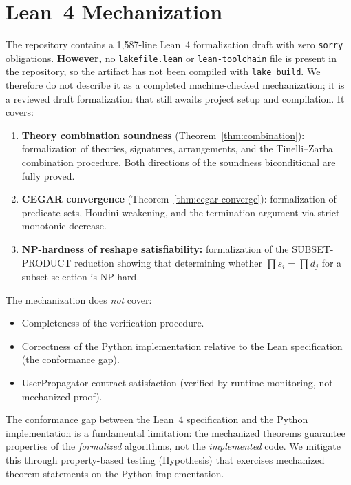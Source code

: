 \documentclass[11pt]{article}
\begin{document}
\section{Lean~4 Mechanization}\label{sec:lean}

The repository contains a 1,587-line Lean~4 formalization draft with zero
\texttt{sorry} obligations. \textbf{However,} no \texttt{lakefile.lean}
or \texttt{lean-toolchain} file is present in the repository, so the
artifact has not been compiled with \texttt{lake build}. We therefore do
not describe it as a completed machine-checked mechanization; it is a
reviewed draft formalization that still awaits project setup and
compilation.
It covers:

\begin{enumerate}[leftmargin=2em]
  \item \textbf{Theory combination soundness} (Theorem~\ref{thm:combination}):
    formalization of theories, signatures, arrangements, and the
    Tinelli--Zarba combination procedure.  Both directions of the
    soundness biconditional are fully proved.
  \item \textbf{CEGAR convergence} (Theorem~\ref{thm:cegar-converge}):
    formalization of predicate sets, Houdini weakening, and the
    termination argument via strict monotonic decrease.
  \item \textbf{NP-hardness of reshape satisfiability:}
    formalization of the SUBSET-PRODUCT reduction showing that
    determining whether $\prod s_i = \prod d_j$ for a
    subset selection is NP-hard.
\end{enumerate}

The mechanization does \emph{not} cover:
\begin{itemize}[leftmargin=2em]
  \item Completeness of the verification procedure.
  \item Correctness of the Python implementation relative
    to the Lean specification (the conformance gap).
  \item UserPropagator contract satisfaction (verified by
    runtime monitoring, not mechanized proof).
\end{itemize}

The conformance gap between the Lean~4 specification and the
Python implementation is a fundamental limitation: the
mechanized theorems guarantee properties of the \emph{formalized}
algorithms, not the \emph{implemented} code.  We mitigate this
through property-based testing (Hypothesis) that exercises
mechanized theorem statements on the Python implementation.
\end{document}
